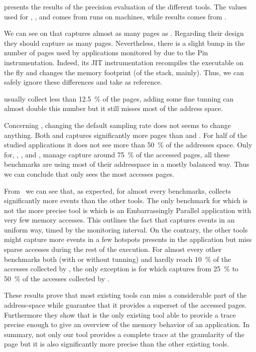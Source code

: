  presents the results of the precision evaluation of the
different tools. The values used for \Mitos, \MitosTun, \Moca and
\TABARNAC comes from runs on \Edel machines, while \MemProf results comes from
\Stremi.

We can see on  that \Moca captures almost as many pages as \TABARNAC.
Regarding their design they should capture as many pages. Nevertheless, there is a slight
bump in the number of pages used by applications monitored by \TABARNAC due to the Pin instrumentation.
Indeed, its JIT instrumentation recompiles the executable on the fly and changes the memory footprint
(of the stack, mainly). Thus, we can safely ignore these differences and take \Moca as reference.

\Mitos usually collect less than \SI{12.5}{\%} of the pages, adding some fine tunning
can almost double this number but it still misses most of the address space.

Concerning \MemProf, changing the default sampling rate does not seems to
change anything. Both \MemProf and \MemProfTun captures significantly more pages than
\Mitos and \MitosTun. For half of the studied applications it does
not see more than \SI{50}{\%} of the addresses space. Only for, \BT, \LU, \SP and \UA,
\MemProf manage capture around \SI{75}{\%} of the accessed pages, all these
benchmarks are using most of their addresspace in a mostly balanced way. Thus
we can conclude that \MemProf only sees the most accesses pages.

From  we can see that, as expected, for almost every benchmarks,
\Moca collects significantly more events than the other tools.  The only
benchmark for which \Moca is not the more precise tool is \EP which is an
Embarrassingly Parallel application with very few memory accesses.
This outlines the fact that \Moca captures events in an uniform way, timed by the monitoring interval.
On the contrary, the other tools might capture more events in a few hotspots presents in the application but miss
sparse accesses during the rest of the execution.
For almost
every other benchmarks both \Mitos (with or without tunning) and \MemProf
hardly reach \SI{10}{\%} of the accesses collected by \Moca, the only exception is
\CG for which \MemProf captures from \SI{25}{\%} to \SI{50}{\%} of the accesses
collected by \Moca.

These results prove that most existing tools can miss a considerable part of
the address-space while \Moca guarantee that it provides a superset of the accessed
pages. Furthermore they show that \Moca is the only existing tool able to provide a
trace precise enough to give an overview of the memory behavior of an application. In
summary, not only our tool provides a complete trace at the granularity of the
page but it is also significantly more precise than the other existing tools.

